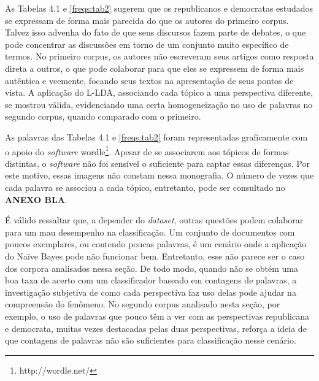 As Tabelas 4.1 e \ref{freqs:tab2} sugerem que os republicanos e democratas estudados se expressam de forma mais parecida do que os autores do primeiro corpus. Talvez isso advenha do fato de que seus discursos fazem parte de debates, o que pode concentrar as discussões em torno de um conjunto muito específico de termos. No primeiro corpus, os autores não escreveram seus artigos como resposta direta a outros, o que pode colaborar para que eles se expressem de forma mais autêntica e veemente, focando seus textos na apresentação de seus pontos de vista. A aplicação do L-LDA, associando cada tópico a uma perspectiva diferente, se mostrou válida, evidenciando uma certa homogeneização no uso de palavras no segundo corpus, quando comparado com o primeiro.

As palavras das Tabelas 4.1 e \ref{freqs:tab2} foram representadas graficamente com o apoio do \emph{software} wordle\footnote{http://wordle.net/}. Apesar de se associarem aos tópicos de formas distintas, o \emph{software} não foi sensível o suficiente para captar essas diferenças. Por este motivo, essas imagens não constam nessa monografia. O número de vezes que cada palavra se associou a cada tópico, entretanto, pode ser consultado no \textbf{ANEXO BLA}. %



É válido ressaltar que, a depender do \emph{dataset}, outras questões podem colaborar para um mau desempenho na classificação. Um conjunto de documentos com poucos exemplares, ou contendo poucas palavras, é um cenário onde a aplicação do Naïve Bayes pode não funcionar bem. Entretanto, esse não parece ser o caso dos corpora analisados nessa seção. De todo modo, quando não se obtém uma boa taxa de acerto com um classificador baseado em contagens de palavras, a investigação subjetiva de como cada perspectiva faz uso delas pode ajudar na compreensão do fenômeno. No segundo corpus analisado nesta seção, por exemplo, o uso de palavras que pouco têm a ver com as perspectivas republicana e democrata, muitas vezes destacadas pelas duas perspectivas, reforça a ideia de que contagens de palavras não são suficientes para classificação nesse cenário. %

